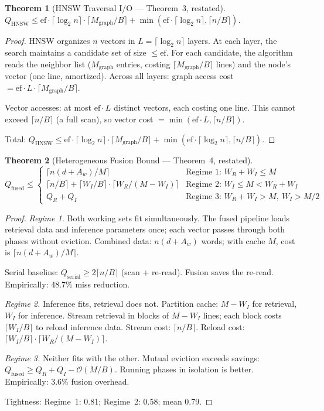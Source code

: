 \documentclass{article}
\newtheorem{theorem}{Theorem}
\theoremstyle{definition}
\theoremstyle{remark}
\newcommand{\BigO}{\mathcal{O}}
\newcommand{\ceil}[1]{\lceil #1 \rceil}
\newcommand{\Qfused}{Q_{\mathrm{fused}}}
\newcommand{\Qhnsw}{Q_{\mathrm{HNSW}}}
\newcommand{\Mgraph}{M_{\mathrm{graph}}}
\begin{document}
\begin{theorem}[HNSW Traversal I/O --- Theorem~3, restated]\label{thm:hnsw-app}
$\Qhnsw \leq \mathrm{ef} \cdot \ceil{\log_2 n} \cdot \ceil{\Mgraph/B} + \min(\mathrm{ef} \cdot \ceil{\log_2 n}, \ceil{n/B})$.
\end{theorem}

\begin{proof}
HNSW organizes $n$ vectors in $L = \ceil{\log_2 n}$ layers. At each layer, the search maintains a candidate set of size $\leq \mathrm{ef}$. For each candidate, the algorithm reads the neighbor list ($\Mgraph$ entries, costing $\ceil{\Mgraph/B}$ lines) and the node's vector (one line, amortized). Across all layers: graph access cost $= \mathrm{ef} \cdot L \cdot \ceil{\Mgraph/B}$.

Vector accesses: at most $\mathrm{ef} \cdot L$ distinct vectors, each costing one line. This cannot exceed $\ceil{n/B}$ (a full scan), so vector cost $= \min(\mathrm{ef} \cdot L, \ceil{n/B})$.

Total: $\Qhnsw \leq \mathrm{ef} \cdot \ceil{\log_2 n} \cdot \ceil{\Mgraph/B} + \min(\mathrm{ef} \cdot \ceil{\log_2 n}, \ceil{n/B})$.
\end{proof}

\begin{theorem}[Heterogeneous Fusion Bound --- Theorem~4, restated]\label{thm:hetero-app}
\[
  \Qfused \leq
  \begin{cases}
    \ceil{n(d+A_w)/M} & \text{Regime 1: } W_R + W_I \leq M \\[4pt]
    \ceil{n/B} + \ceil{W_I/B} \cdot \ceil{W_R/(M - W_I)} & \text{Regime 2: } W_I \leq M < W_R + W_I \\[4pt]
    Q_R + Q_I & \text{Regime 3: } W_R + W_I > M,\ W_I > M/2
  \end{cases}
\]
\end{theorem}

\begin{proof}
\emph{Regime 1.} Both working sets fit simultaneously. The fused pipeline loads retrieval data and inference parameters once; each vector passes through both phases without eviction. Combined data: $n(d + A_w)$ words; with cache $M$, cost is $\ceil{n(d+A_w)/M}$.

Serial baseline: $Q_{\text{serial}} \geq 2\ceil{n/B}$ (scan + re-read). Fusion saves the re-read. Empirically: 48.7\% miss reduction.

\emph{Regime 2.} Inference fits, retrieval does not. Partition cache: $M - W_I$ for retrieval, $W_I$ for inference. Stream retrieval in blocks of $M - W_I$ lines; each block costs $\ceil{W_I/B}$ to reload inference data. Stream cost: $\ceil{n/B}$. Reload cost: $\ceil{W_I/B} \cdot \ceil{W_R/(M-W_I)}$.

\emph{Regime 3.} Neither fits with the other. Mutual eviction exceeds savings: $\Qfused \geq Q_R + Q_I - \BigO(M/B)$. Running phases in isolation is better. Empirically: 3.6\% fusion overhead.

Tightness: Regime~1: 0.81; Regime~2: 0.58; mean 0.79.
\end{proof}
\end{document}

